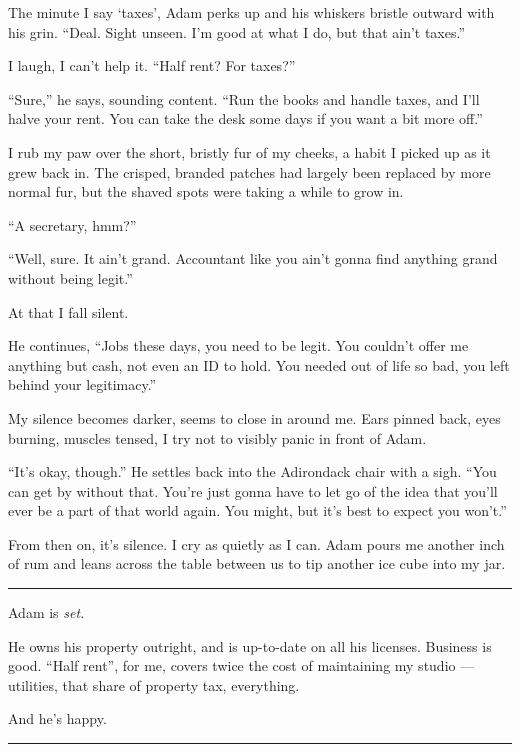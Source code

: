 The minute I say `taxes', Adam perks up and his whiskers bristle outward with his grin. ``Deal. Sight unseen. I'm good at what I do, but that ain't taxes.''

I laugh, I can't help it. ``Half rent? For taxes?''

``Sure,'' he says, sounding content. ``Run the books and handle taxes, and I'll halve your rent. You can take the desk some days if you want a bit more off.''

I rub my paw over the short, bristly fur of my cheeks, a habit I picked up as it grew back in. The crisped, branded patches had largely been replaced by more normal fur, but the shaved spots were taking a while to grow in.

``A secretary, hmm?''

``Well, sure. It ain't grand. Accountant like you ain't gonna find anything grand without being legit.''

At that I fall silent.

He continues, ``Jobs these days, you need to be legit. You couldn't offer me anything but cash, not even an ID to hold. You needed out of life so bad, you left behind your legitimacy.''

My silence becomes darker, seems to close in around me. Ears pinned back, eyes burning, muscles tensed, I try not to visibly panic in front of Adam.

``It's okay, though.'' He settles back into the Adirondack chair with a sigh. ``You can get by without that. You're just gonna have to let go of the idea that you'll ever be a part of that world again. You might, but it's best to expect you won't.''

From then on, it's silence. I cry as quietly as I can. Adam pours me another inch of rum and leans across the table between us to tip another ice cube into my jar.

\begin{center}\rule{0.5\linewidth}{\linethickness}\end{center}

Adam is \emph{set.}

He owns his property outright, and is up-to-date on all his licenses. Business is good. ``Half rent'', for me, covers twice the cost of maintaining my studio --- utilities, that share of property tax, everything.

And he's happy.

\begin{center}\rule{0.5\linewidth}{\linethickness}\end{center}

